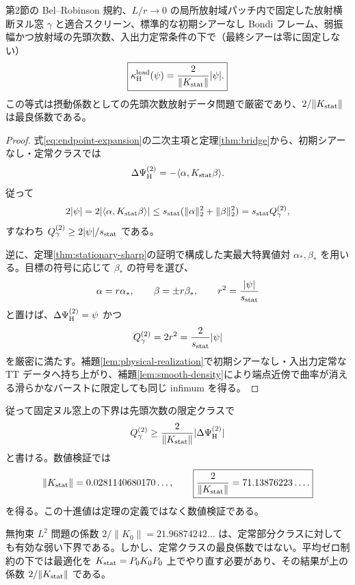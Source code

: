 \begin{theorem}
\label{thm:main-physical}
第2節の Bel--Robinson 規約、$L/r\to0$ の局所放射域パッチ内で固定した放射横断ヌル窓 $\gamma$ と適合スクリーン、標準的な初期シアーなし Bondi フレーム、弱振幅かつ放射域の先頭次数、入出力定常条件の下で（最終シアーは零に固定しない）
\begin{equation}
\boxed{\kappa_{\rm H}^{\rm lead}(\psi)=\frac{2}{\|K_{\rm stat}\|}|\psi|.}
\label{eq:main-physical-value}
\end{equation}
この等式は摂動係数としての先頭次数放射データ問題で厳密であり、$2/\|K_{\rm stat}\|$ は最良係数である。
\end{theorem}
\begin{proof}
式\eqref{eq:endpoint-expansion}の二次主項と定理\ref{thm:bridge}から、初期シアーなし・定常クラスでは
\[
\Delta\Psi_{\rm H}^{(2)}=-\langle\alpha,K_{\rm stat}\beta\rangle .
\]
従って
\[
2|\psi|=2|\langle\alpha,K_{\rm stat}\beta\rangle|
\le s_{\rm stat}(\|\alpha\|_2^2+\|\beta\|_2^2)=s_{\rm stat}Q_\gamma^{(2)},
\]
すなわち $Q_\gamma^{(2)}\ge2|\psi|/s_{\rm stat}$ である。

逆に、定理\ref{thm:stationary-sharp}の証明で構成した実最大特異値対 $\alpha_*,\beta_*$ を用いる。目標の符号に応じて $\beta_*$ の符号を選び、
\[
\alpha=r\alpha_*,\qquad \beta=\pm r\beta_*,\qquad r^2=\frac{|\psi|}{s_{\rm stat}}
\]
と置けば、$\Delta\Psi_{\rm H}^{(2)}=\psi$ かつ
\[
Q_\gamma^{(2)}=2r^2=\frac{2}{s_{\rm stat}}|\psi|
\]
を厳密に満たす。補題\ref{lem:physical-realization}で初期シアーなし・入出力定常な TT データへ持ち上がり、補題\ref{lem:smooth-density}により端点近傍で曲率が消える滑らかなバーストに限定しても同じ infimum を得る。
\end{proof}

従って固定ヌル窓上の下界は先頭次数の限定クラスで
\begin{equation}
Q_\gamma^{(2)}\ge\frac{2}{\|K_{\rm stat}\|}|\Delta\Psi_{\rm H}^{(2)}|
\label{eq:main-bound}
\end{equation}
と書ける。数値検証では
\begin{equation}
\|K_{\rm stat}\|=0.0281140680170\ldots,
\qquad
\boxed{\frac{2}{\|K_{\rm stat}\|}=71.13876223\ldots.}
\label{eq:main-bound-num}
\end{equation}
を得る。この十進値は定理の定義ではなく数値検証である。

\begin{remark}
無拘束 $L^2$ 問題の係数 $2/\|K_0\|=21.96874242\ldots$ は、定常部分クラスに対しても有効な弱い下界である。しかし、定常クラスの最良係数ではない。平均ゼロ制約の下では最適化を $K_{\rm stat}=P_0K_0P_0$ 上でやり直す必要があり、その結果が上の係数 $2/\|K_{\rm stat}\|$ である。
\end{remark}
